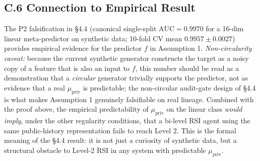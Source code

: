 \subsection*{C.6 Connection to Empirical Result}

The P2 falsification in \S4.4 (canonical single-split $\text{AUC} = 0.9970$ for a 16-dim linear meta-predictor on synthetic data; 10-fold CV mean $0.9957\pm0.0027$) provides empirical evidence for the predictor $f$ in Assumption 1. \emph{Non-circularity caveat:} because the current synthetic generator constructs the target as a noisy copy of a feature that is also an input to $f$, this number should be read as a demonstration that a \emph{circular} generator trivially supports the predictor, not as evidence that a real $\mu_{\text{priv}}$ is predictable; the non-circular audit-gate design of \S4.4 is what makes Assumption 1 genuinely falsifiable on real lineage. Combined with the proof above, the empirical predictability of $\mu_{\text{priv}}$ on the linear class \emph{would imply}, under the other regularity conditions, that a bi-level RSI agent using the same public-history representation fails to reach Level 2. This is the formal meaning of the \S4.4 result: it is not just a curiosity of synthetic data, but a structural obstacle to Level-2 RSI in any system with predictable $\mu_{\text{priv}}$.
